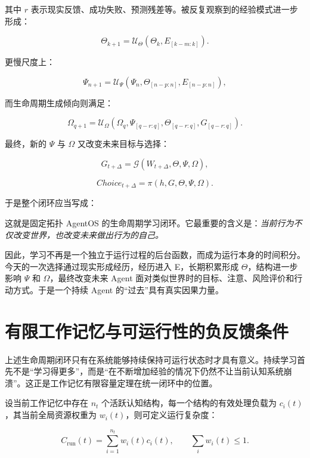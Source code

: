 其中 $r$ 表示现实反馈、成功失败、预测残差等。被反复观察到的经验模式进一步形成：

\[
\Theta_{k+1}
=
\mathcal{U}_\Theta
(
\Theta_k,
E_{[k-m:k]}
).
\]

更慢尺度上：

\[
\Psi_{n+1}
=
\mathcal{U}_\Psi
(
\Psi_n,
\Theta_{[n-p:n]},
E_{[n-p:n]}
),
\]

而生命周期生成倾向则满足：

\[
\Omega_{q+1}
=
\mathcal{U}_\Omega
(
\Omega_q,
\Psi_{[q-r:q]},
\Theta_{[q-r:q]},
G_{[q-r:q]}
).
\]

最终，新的 $\Psi$ 与 $\Omega$ 又改变未来目标与选择：

\[
G_{t+\Delta}
=
\mathcal{G}
(
W_{t+\Delta},
\Theta,
\Psi,
\Omega
),
\]

\[
Choice_{t+\Delta}
=
\pi
(
h,
G,
\Theta,
\Psi,
\Omega
).
\]

于是整个闭环应当写成：

\begin{statementbox}
\centering
{}
\end{statementbox}

这就是固定拓扑 AgentOS 的生命周期学习闭环。它最重要的含义是：\emph{当前行为不仅改变世界，也改变未来做出行为的自己。}

因此，学习不再是一个独立于运行过程的后台函数，而成为运行本身的时间积分。今天的一次选择通过现实形成经历，经历进入 E，长期积累形成 $\Theta$，结构进一步影响 $\Psi$ 和 $\Omega$，最终改变未来 Agent 面对类似世界时的目标、注意、风险评价和行动方式。于是一个持续 Agent 的“过去”具有真实因果力量。

\section{有限工作记忆与可运行性的负反馈条件}

上述生命周期闭环只有在系统能够持续保持可运行状态时才具有意义。持续学习首先不是“学习得更多”，而是“在不断增加经验的情况下仍然不让当前认知系统崩溃”。这正是工作记忆有限容量定理在统一闭环中的位置。

设当前工作记忆中存在 $n_t$ 个活跃认知结构，每一个结构的有效处理负载为 $c_i(t)$，其当前全局资源权重为 $w_i(t)$，则可定义运行复杂度：

\[
C_{\mathrm{run}}(t)
=
\sum_{i=1}^{n_t}
w_i(t)c_i(t),
\qquad
\sum_iw_i(t)\leq 1.
\]

